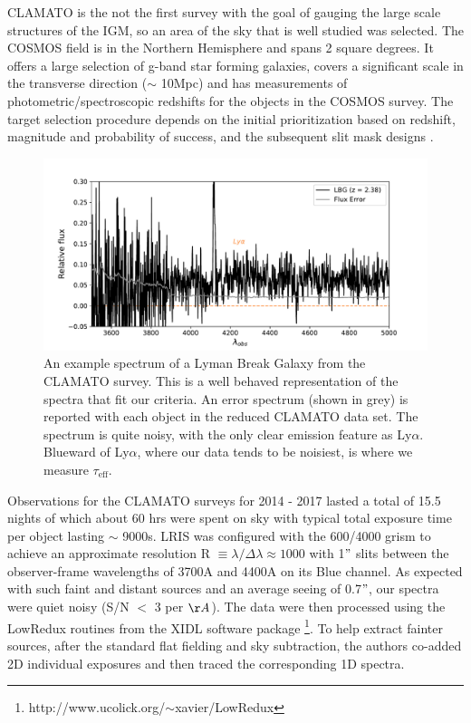 \documentclass[preprint2,times,tighten]{aastex6}
\newcommand{\teff}{$\tau_\mathrm{eff}$\space}
\newcommand{\lya}{Ly$\alpha$\space}
\begin{document}
CLAMATO is the not the first survey with the goal of gauging the large scale structures of the IGM, so an area of the sky that is well studied was selected. The COSMOS field \citep{scoville_cosmic_2007} is in the Northern Hemisphere and spans 2 square degrees. It offers a large selection of g-band star forming galaxies, covers a significant scale in the transverse direction ($\sim$ 10Mpc) and has measurements of photometric/spectroscopic redshifts for the objects in the COSMOS survey. The target selection procedure depends on the initial prioritization based on redshift, magnitude and probability of success, and the subsequent slit mask designs \citep{lee_first_2018}. 

\begin{figure}[ht]
    \begin{center}
    \includegraphics[scale=.5]{exspec.pdf}
    \caption{An example spectrum of a Lyman Break Galaxy from the CLAMATO survey. This is a well behaved representation of the spectra that fit our criteria. An error spectrum (shown in grey) is reported with each object in the reduced CLAMATO data set. The spectrum is quite noisy, with the only clear emission feature as \lya. Blueward of \lya, where our data tends to be noisiest, is where we measure \teff.}
    \label{fig:exspec}
    \end{center}
\end{figure}


Observations for the CLAMATO surveys for 2014 - 2017 lasted a total of 15.5 nights of which about 60 hrs were spent on sky with typical total exposure time per object lasting $\sim$ 9000s. LRIS was configured with the 600/4000 grism to achieve an approximate resolution R $\equiv \lambda/\Delta\lambda \approx 1000$ with 1$"$ slits between the observer-frame wavelengths of 3700A and 4400A on its Blue channel. As expected with such faint and distant sources and an average seeing of 0.7$"$, our spectra were quiet noisy (S/N $<$ 3 per $\AA$). The data were then processed using the LowRedux routines from the XIDL software package \footnote{http://www.ucolick.org/$\sim$xavier/LowRedux}. To help extract fainter sources, after the standard flat fielding and sky subtraction, the authors co-added 2D individual exposures and then traced the corresponding 1D spectra. 
\end{document}
